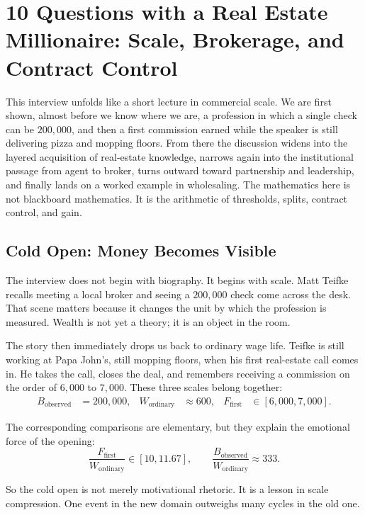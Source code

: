 \chapter{10 Questions with a Real Estate Millionaire: Scale, Brokerage, and Contract Control}

This interview unfolds like a short lecture in commercial scale. We are first shown, almost before we know where we are, a profession in which a single check can be \(200{,}000\), and then a first commission earned while the speaker is still delivering pizza and mopping floors. From there the discussion widens into the layered acquisition of real-estate knowledge, narrows again into the institutional passage from agent to broker, turns outward toward partnership and leadership, and finally lands on a worked example in wholesaling. The mathematics here is not blackboard mathematics. It is the arithmetic of thresholds, splits, contract control, and gain.

\section{Cold Open: Money Becomes Visible}

The interview does not begin with biography. It begins with scale. Matt Teifke recalls meeting a local broker and seeing a \(200{,}000\) check come across the desk. That scene matters because it changes the unit by which the profession is measured. Wealth is not yet a theory; it is an object in the room.

The story then immediately drops us back to ordinary wage life. Teifke is still working at Papa John's, still mopping floors, when his first real-estate call comes in. He takes the call, closes the deal, and remembers receiving a commission on the order of \(6{,}000\) to \(7{,}000\). These three scales belong together:
\begin{align}
B_{\mathrm{observed}} &= 200{,}000, &
W_{\mathrm{ordinary}} &\approx 600, &
F_{\mathrm{first}} &\in [6{,}000,7{,}000].
\end{align}

The corresponding comparisons are elementary, but they explain the emotional force of the opening:
\begin{equation}
\frac{F_{\mathrm{first}}}{W_{\mathrm{ordinary}}} \in [10,11.67],
\qquad
\frac{B_{\mathrm{observed}}}{W_{\mathrm{ordinary}}} \approx 333.
\end{equation}

So the cold open is not merely motivational rhetoric. It is a lesson in scale compression. One event in the new domain outweighs many cycles in the old one.

